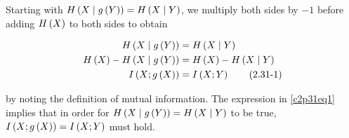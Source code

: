 \documentclass[ClusteringConnectionsMAIN.tex]{subfiles}
\begin{document}
	

  Starting with $H \left(  X \mid g \left( Y \right)  \right) = H \left( X \mid Y \right)$, we multiply both sides by $-1$ before adding $H \left( X \right)$ to both sides to obtain

\begin{align}  \label{c2p31eq1}
H \left(  X \mid g \left( Y \right)  \right) &= H \left( X \mid Y \right)   \notag \\
H \left( X \right) - H \left(  X \mid g \left( Y \right)  \right) &= H \left( X \right) - H \left( X \mid Y \right) \notag  \\
I \left( X; g \left( X \right)  \right) &= I \left( X; Y \right)  \tag{2.31-1}
\end{align}

by noting the definition of mutual information.  The expression in \ref{c2p31eq1} implies that in order for $H \left(  X \mid g \left( Y \right)  \right) = H \left( X \mid Y \right)$ to be true, $I \left( X; g \left( X \right)  \right) = I \left( X; Y \right)$ must hold.
\end{document}

